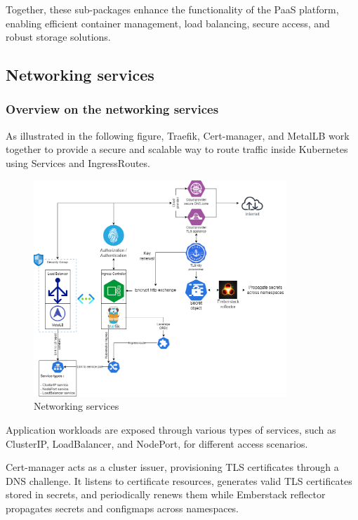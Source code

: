 \hspace{7mm}Together, these sub-packages enhance the functionality of the PaaS platform, enabling efficient container management, load balancing, secure access, and robust storage solutions.

\subsection{Networking services}

\subsubsection{Overview on the networking services}

\hspace{7mm}As illustrated in the following figure, Traefik, Cert-manager, and MetalLB work together to provide a secure and scalable way to route traffic inside Kubernetes using Services and IngressRoutes.

\begin{figure}[H]\centering
\includegraphics[width=0.85\textwidth,angle=00]{assets/f22.png}
\caption{ Networking services}
\label{fig:Networking services}
\end{figure}

\hspace{7mm}Application workloads are exposed through various types of services, such as ClusterIP, LoadBalancer, and NodePort, for different access scenarios.

\hspace{7mm}Cert-manager acts as a cluster issuer, provisioning TLS certificates through a DNS challenge. It listens to certificate resources, generates valid TLS certificates stored in secrets, and periodically renews them while Emberstack reflector propagates secrets and configmaps across namespaces.

